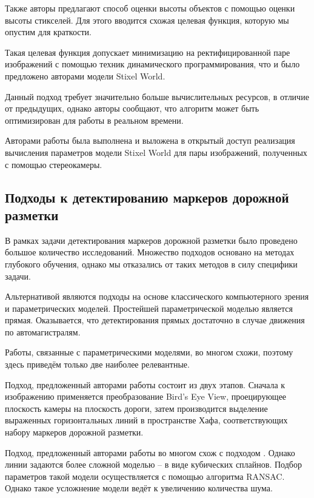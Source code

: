 \documentclass[aps,%
14pt,%
final,%
oneside,
onecolumn,%
musixtex, %
superscriptaddress,%
centertags]{extarticle} %
\begin{document}
Также авторы предлагают способ оценки высоты объектов с помощью оценки высоты стикселей. Для этого вводится схожая целевая функция, которую мы опустим для краткости.

Такая целевая функция допускает минимизацию на ректифицированной паре изображений с помощью техник динамического программирования, что и было предложено авторами модели Stixel World.

Данный подход требует значительно больше вычислительных ресурсов, в отличие от предыдущих, однако авторы \cite{benenson2011stixels} сообщают, что алгоритм может быть оптимизирован для работы в реальном времени.

Авторами работы \cite{benenson2011stixels} была выполнена и выложена в открытый доступ реализация\cite{doppia_repo} вычисления параметров модели Stixel World для пары изображений, полученных с помощью стереокамеры. 


\subsection{Подходы к детектированию маркеров дорожной разметки}

В рамках задачи детектирования маркеров дорожной разметки было проведено большое количество исследований\cite{hillel2014recent}. Множество подходов основано на методах глубокого обучения, однако мы отказались от таких методов в силу специфики задачи.

Альтернативой являются подходы на основе классического компьютерного зрения и параметрических моделей. Простейшей параметрической моделью является прямая. Оказывается, что детектирования прямых достаточно в случае движения по автомагистралям\cite{hillel2014recent}.

Работы, связанные с параметрическими моделями, во многом схожи, поэтому здесь приведём только две наиболее релевантные. 

Подход, предложенный авторами работы \cite{song2017real} состоит из двух этапов. Сначала к изображению применяется преобразование Bird's Eye View, проецирующее плоскость камеры на плоскость дороги, затем производится выделение выраженных горизонтальных линий в пространстве Хафа, соответствующих набору маркеров дорожной разметки.

Подход, предложенный авторами работы \cite{aly2008real} во многом схож с подходом \cite{song2017real}. Однако линии задаются более сложной моделью -- в виде кубических сплайнов. Подбор параметров такой модели осуществляется с помощью алгоритма RANSAC\cite{fischler1987random}. Однако такое усложнение модели ведёт к увеличению количества шума.
\end{document}
